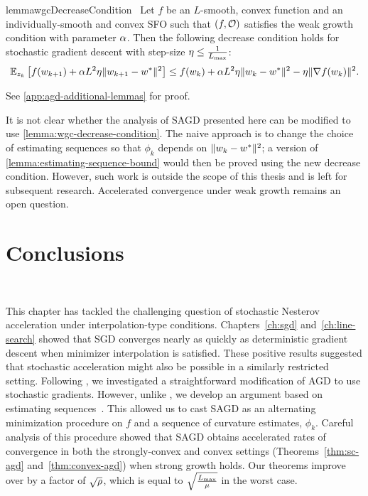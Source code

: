 \begin{restatable}{lemma}{wgcDecreaseCondition}~\label{lemma:wgc-decrease-condition}
     Let \( f \) be an \( L \)-smooth, convex function and \oracle{} an individually-smooth and convex \ac{SFO} such that \( \rbr{f, \oracle{}} \) satisfies the weak growth condition with parameter \( \wgc \). 
    Then the following decrease condition holds for stochastic gradient descent with step-size \( \eta \leq \frac{1}{\Lmax} \):
    \[ \E_{\zk} \sbr{f(\wkk) + \wgc L^2 \eta \norm{\wkk - \wopt}^2} \leq f(\wk) + \wgc L^2 \eta \norm{\wk - \wopt}^2 - \eta \norm{\grad(\wk)}^2. \]
\end{restatable}
\noindent See \autoref{app:agd-additional-lemmas} for proof. \hfill \break

It is not clear whether the analysis of \ac{SAGD} presented here can be modified to use \autoref{lemma:wgc-decrease-condition}. 
The naive approach is to change the choice of estimating sequences so that \( \phi_k \)  depends on \( \norm{\wk - \wopt}^2 \); a version of \autoref{lemma:estimating-sequence-bound} would then be proved using the new decrease condition.
However, such work is outside the scope of this thesis and is left for subsequent research.
Accelerated convergence under weak growth remains an open question.
\fi

\section{Conclusions}~\label{sec:acceleration-conclusions}

This chapter has tackled the challenging question of stochastic Nesterov acceleration under interpolation-type conditions.
Chapters~\ref{ch:sgd} and~\ref{ch:line-search} showed that \ac{SGD} converges nearly as quickly as deterministic gradient descent when minimizer interpolation is satisfied.
These positive results suggested that stochastic acceleration might also be possible in a similarly restricted setting.
Following \citet{vaswani2019fast}, we investigated a straightforward modification of \ac{AGD} to use stochastic gradients. 
However, unlike \citet{vaswani2019fast}, we develop an argument based on estimating sequences~\citep{nesterov2004lectures}.
This allowed us to cast \ac{SAGD} as an alternating minimization procedure on \( f \) and a sequence of curvature estimates, \( \phi_k \).
Careful analysis of this procedure showed that \ac{SAGD} obtains accelerated rates of convergence in both the strongly-convex and convex settings (Theorems~\ref{thm:sc-agd} and~\ref{thm:convex-agd}) when strong growth holds.
Our theorems improve over \citet{vaswani2019fast} by a factor of \( \sqrt{\sgc} \), which is equal to \( \sqrt{\frac{\Lmax}{\mu}} \) in the worst case. 



